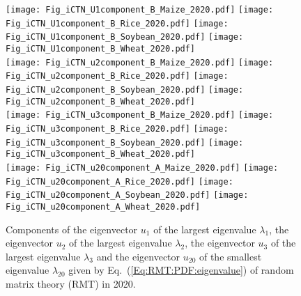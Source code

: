 \documentclass[preprint,3p,times,sort&compress]{elsarticle}
\begin{document}
 \begin{figure}[h!]
      \centering
      \texttt{[image: Fig\_iCTN\_U1component\_B\_Maize\_2020.pdf]}
      \texttt{[image: Fig\_iCTN\_U1component\_B\_Rice\_2020.pdf]}
      \texttt{[image: Fig\_iCTN\_U1component\_B\_Soybean\_2020.pdf]}
      \texttt{[image: Fig\_iCTN\_U1component\_B\_Wheat\_2020.pdf]}
       \\
      \texttt{[image: Fig\_iCTN\_u2component\_B\_Maize\_2020.pdf]}
      \texttt{[image: Fig\_iCTN\_u2component\_B\_Rice\_2020.pdf]}
      \texttt{[image: Fig\_iCTN\_u2component\_B\_Soybean\_2020.pdf]}
      \texttt{[image: Fig\_iCTN\_u2component\_B\_Wheat\_2020.pdf]}
       \\
      \texttt{[image: Fig\_iCTN\_u3component\_B\_Maize\_2020.pdf]}
      \texttt{[image: Fig\_iCTN\_u3component\_B\_Rice\_2020.pdf]}
      \texttt{[image: Fig\_iCTN\_u3component\_B\_Soybean\_2020.pdf]}
      \texttt{[image: Fig\_iCTN\_u3component\_B\_Wheat\_2020.pdf]}
       \\
      \texttt{[image: Fig\_iCTN\_u20component\_A\_Maize\_2020.pdf]}
      \texttt{[image: Fig\_iCTN\_u20component\_A\_Rice\_2020.pdf]}
      \texttt{[image: Fig\_iCTN\_u20component\_A\_Soybean\_2020.pdf]}
      \texttt{[image: Fig\_iCTN\_u20component\_A\_Wheat\_2020.pdf]}
      \\
      \caption{Components of the eigenvector $u_1$ of the largest eigenvalue $\lambda_1$, the eigenvector $u_2$ of the largest eigenvalue $\lambda_2$, the eigenvector $u_3$ of the largest eigenvalue $\lambda_3$ and the eigenvector $u_{20}$ of the smallest eigenvalue $\lambda_{20}$ given by Eq.~(\ref{Eq:RMT:PDF:eigenvalue}) of random matrix theory (RMT) in 2020.}
      \label{Fig:iCTN:PDF:eigenvector:component:2020}
\end{figure}
\end{document}
